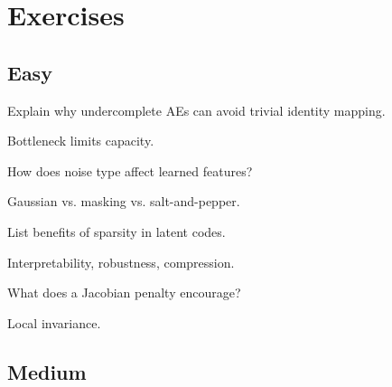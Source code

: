 
\section*{Exercises}

\subsection*{Easy}

\begin{exercisebox}[easy]
\begin{problem}[Undercomplete AE]
Explain why undercomplete AEs can avoid trivial identity mapping.
\end{problem}
\begin{hintbox}
Bottleneck limits capacity.
\end{hintbox}
\end{exercisebox}


\begin{exercisebox}[easy]
\begin{problem}
How does noise type affect learned features?
\end{problem}
\begin{hintbox}
Gaussian vs. masking vs. salt-and-pepper.
\end{hintbox}
\end{exercisebox}


\begin{exercisebox}[easy]
\begin{problem}
List benefits of sparsity in latent codes.
\end{problem}
\begin{hintbox}
Interpretability, robustness, compression.
\end{hintbox}
\end{exercisebox}


\begin{exercisebox}[easy]
\begin{problem}
What does a Jacobian penalty encourage?
\end{problem}
\begin{hintbox}
Local invariance.
\end{hintbox}
\end{exercisebox}


\subsection*{Medium}

